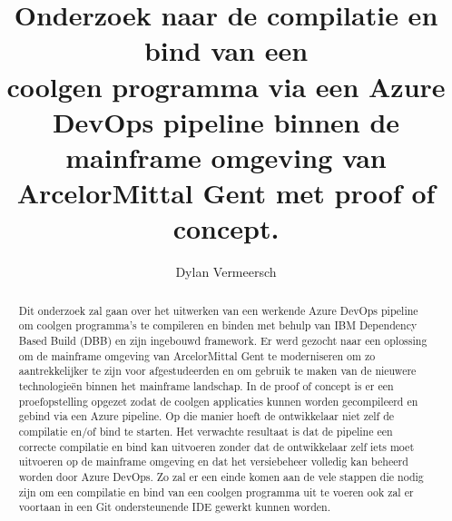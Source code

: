 \documentclass{hogent-article}
\title{Onderzoek naar de compilatie en bind van een \\coolgen programma via een Azure DevOps pipeline binnen de mainframe omgeving van ArcelorMittal Gent met proof of concept.}
\author{Dylan Vermeersch}
\begin{document}
\begin{abstract}
  Dit onderzoek zal gaan over het uitwerken van een werkende Azure DevOps pipeline om coolgen programma's te compileren en binden met behulp van IBM Dependency Based Build (DBB) en zijn ingebouwd framework. Er werd gezocht naar een oplossing om de mainframe omgeving van ArcelorMittal Gent te moderniseren om zo aantrekkelijker te zijn voor afgestudeerden en om gebruik te maken van de nieuwere technologieën binnen het mainframe landschap. In de proof of concept is er een proefopstelling opgezet zodat de coolgen applicaties kunnen worden gecompileerd en gebind via een Azure pipeline. Op die manier hoeft de ontwikkelaar niet zelf de compilatie en/of bind te starten. Het verwachte resultaat is dat de pipeline een correcte compilatie en bind kan uitvoeren zonder dat de ontwikkelaar zelf iets moet uitvoeren op de mainframe omgeving en dat het versiebeheer volledig kan beheerd worden door Azure DevOps. Zo zal er een einde komen aan de vele stappen die nodig zijn om een compilatie en bind van een coolgen programma uit te voeren ook zal er voortaan in een Git ondersteunende IDE gewerkt kunnen worden.
\end{abstract}

\tableofcontents



\printbibliography[heading=bibintoc]
\end{document}

